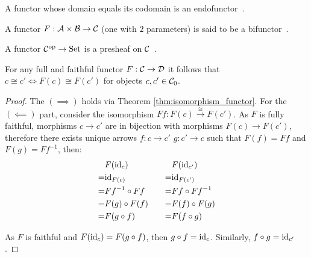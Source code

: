 \begin{definition}
  A functor whose domain equals its codomain is an
  endofunctor~\parencite[p.~30]{adamek_herrlich_strecker:joy_cats}.
\end{definition}

\begin{definition}
  A functor $F:\mathcal{A}\times \mathcal{B} \to \mathcal{C}$ (one with $2$ parameters) is said to be a
  bifunctor~\parencite[p.~37]{lane:working_mathematician}.
\end{definition}

\begin{definition}
  A functor $\mathcal{C}^{\mathrm{op}} \to \mathrm{Set}$ is a presheaf on
  $\mathcal{C}$~\parencite[p.~24]{leinster:basic_category_theory}.
\end{definition}

\begin{theorem}\label{thm:full_faithful_isomorphism}

  For any full and faithful functor $F:\mathcal{C}\to \mathcal{D}$ it follows that $c \cong c'
  \iff F(c) \cong F(c')$ for objects $c, c'\in \mathcal{C}_0$.

  \begin{proof}
    The $(\implies)$ holds via Theorem \ref{thm:isomorphism_functor}. For the
    $(\impliedby)$ part, consider the isomorphism $Ff: F(c) \overset{\cong}{\to}
    F(c')$. As $F$ is fully faithful, morphisms $c\to c'$ are in bijection
    with morphisms $F(c)\to F(c')$, therefore there exists unique arrows $f:c\to c'$ $g:c'\to c$ such that $F(f) = Ff$ and $F(g) = Ff^{-1}$, then:
    \[
      \begin{aligned}
        &F(\mathrm{id}_c)\\
        =& \mathrm{id}_{F(c)}\\
        =& Ff^{-1} \circ Ff\\
        =& F(g) \circ F(f)\\
        =& F(g\circ f)
      \end{aligned}
      \qquad
      \begin{aligned}
        &F(\mathrm{id}_{c'})\\
        =& \mathrm{id}_{F(c')}\\
        =& Ff \circ Ff^{-1}\\
        =& F(f) \circ F(g)\\
        =& F(f\circ g)
      \end{aligned}
    \]

    As $F$ is faithful and $F(\mathrm{id}_c) = F(g\circ f)$, then $g\circ f = \mathrm{id}_c$.
    Similarly, $f\circ g = \mathrm{id}_{c'}$.
  \end{proof}
\end{theorem}